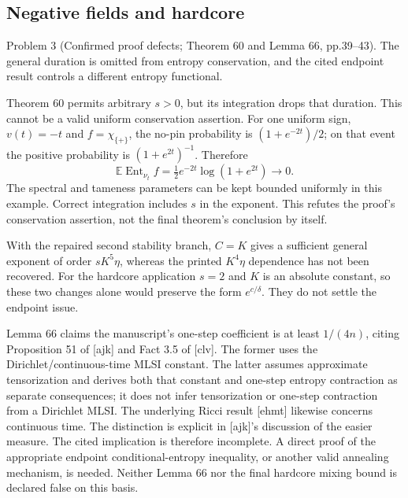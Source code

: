 \documentclass[10pt]{article}
\begin{document}
\subsection*{Negative fields and hardcore}
Problem 3 (Confirmed proof defects; Theorem 60 and Lemma 66, pp.39–43).  The general duration is omitted from entropy conservation, and the cited endpoint result controls a different entropy functional.\par
Theorem 60 permits arbitrary \(s>0\), but its integration drops that duration. This cannot be a valid uniform conservation assertion. For one uniform sign, \(v(t)=-t\) and \(f=\chi_{\{+\}}\), the no-pin probability is \((1+e^{-2t})/2\); on that event the positive probability is \((1+e^{2t})^{-1}\). Therefore \[\mathbb E\operatorname{Ent}_{\nu_t}f
     =\tfrac12e^{-2t}\log(1+e^{2t})\longrightarrow0.\] The spectral and tameness parameters can be kept bounded uniformly in this example. Correct integration includes \(s\) in the exponent. This refutes the proof’s conservation assertion, not the final theorem’s conclusion by itself.\par
With the repaired second stability branch, \(C=K\) gives a sufficient general exponent of order \(sK^5\eta\), whereas the printed \(K^4\eta\) dependence has not been recovered. For the hardcore application \(s=2\) and \(K\) is an absolute constant, so these two changes alone would preserve the form \(e^{c/\delta}\). They do not settle the endpoint issue.\par
Lemma 66 claims the manuscript’s one-step coefficient is at least \(1/(4n)\), citing Proposition 51 of [ajk] and Fact 3.5 of [clv]. The former uses the Dirichlet/continuous-time MLSI constant. The latter assumes approximate tensorization and derives both that constant and one-step entropy contraction as separate consequences; it does not infer tensorization or one-step contraction from a Dirichlet MLSI. The underlying Ricci result [ehmt] likewise concerns continuous time. The distinction is explicit in [ajk]’s discussion of the easier measure. The cited implication is therefore incomplete. A direct proof of the appropriate endpoint conditional-entropy inequality, or another valid annealing mechanism, is needed. Neither Lemma 66 nor the final hardcore mixing bound is declared false on this basis.\par
\end{document}
